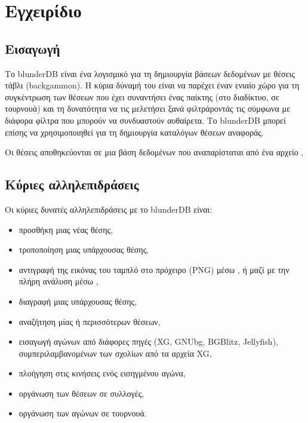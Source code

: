 \documentclass[letterpaper,10pt,greek]{sphinxmanual}
\begin{document}
\sphinxstepscope


\section{Εγχειρίδιο}
\label{\detokenize{manuel:manuel}}\label{\detokenize{manuel:id1}}\label{\detokenize{manuel::doc}}

\subsection{Εισαγωγή}
\label{\detokenize{manuel:introduction}}
\sphinxAtStartPar
Το blunderDB είναι ένα λογισμικό για τη δημιουργία βάσεων δεδομένων με θέσεις τάβλι (backgammon). Η κύρια δύναμή του είναι να παρέχει έναν ενιαίο χώρο για τη συγκέντρωση των θέσεων που έχει συναντήσει ένας παίκτης (στο διαδίκτυο, σε τουρνουά) και τη δυνατότητα να τις μελετήσει ξανά φιλτράροντάς τις σύμφωνα με διάφορα φίλτρα που μπορούν να συνδυαστούν αυθαίρετα. Το blunderDB μπορεί επίσης να χρησιμοποιηθεί για τη δημιουργία καταλόγων θέσεων αναφοράς.

\sphinxAtStartPar
Οι θέσεις αποθηκεύονται σε μια βάση δεδομένων που αναπαρίσταται από ένα αρχείο .


\subsection{Κύριες αλληλεπιδράσεις}
\label{\detokenize{manuel:interactions-principales}}
\sphinxAtStartPar
Οι κύριες δυνατές αλληλεπιδράσεις με το blunderDB είναι:
\begin{itemize}
\item {} 
\sphinxAtStartPar
προσθήκη μιας νέας θέσης,

\item {} 
\sphinxAtStartPar
τροποποίηση μιας υπάρχουσας θέσης,

\item {} 
\sphinxAtStartPar
αντιγραφή της εικόνας του ταμπλό στο πρόχειρο (PNG) μέσω , ή μαζί με την πλήρη ανάλυση μέσω ,

\item {} 
\sphinxAtStartPar
διαγραφή μιας υπάρχουσας θέσης,

\item {} 
\sphinxAtStartPar
αναζήτηση μίας ή περισσότερων θέσεων,

\item {} 
\sphinxAtStartPar
εισαγωγή αγώνων από διάφορες πηγές (XG, GNUbg, BGBlitz, Jellyfish), συμπεριλαμβανομένων των σχολίων από τα αρχεία XG,

\item {} 
\sphinxAtStartPar
πλοήγηση στις κινήσεις ενός εισηγμένου αγώνα,

\item {} 
\sphinxAtStartPar
οργάνωση των θέσεων σε συλλογές,

\item {} 
\sphinxAtStartPar
οργάνωση των αγώνων σε τουρνουά.

\end{itemize}
\end{document}
